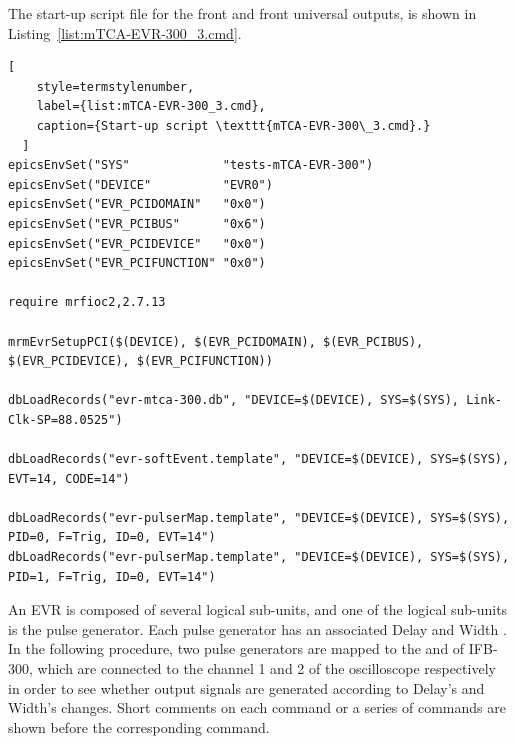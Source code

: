 \documentclass[11pt
  , a4paper
  , article
  , oneside
  , showtrims
]{memoir}
\begin{document}
The start-up script file for the front and front universal outputs,  is shown in Listing~\ref{list:mTCA-EVR-300_3.cmd}. 
\begin{lstlisting}[ 
    style=termstylenumber,
    label={list:mTCA-EVR-300_3.cmd},
    caption={Start-up script \texttt{mTCA-EVR-300\_3.cmd}.}
  ]
epicsEnvSet("SYS"             "tests-mTCA-EVR-300")
epicsEnvSet("DEVICE"          "EVR0")
epicsEnvSet("EVR_PCIDOMAIN"   "0x0")
epicsEnvSet("EVR_PCIBUS"      "0x6")
epicsEnvSet("EVR_PCIDEVICE"   "0x0")
epicsEnvSet("EVR_PCIFUNCTION" "0x0")

require mrfioc2,2.7.13

mrmEvrSetupPCI($(DEVICE), $(EVR_PCIDOMAIN), $(EVR_PCIBUS), $(EVR_PCIDEVICE), $(EVR_PCIFUNCTION))

dbLoadRecords("evr-mtca-300.db", "DEVICE=$(DEVICE), SYS=$(SYS), Link-Clk-SP=88.0525")

dbLoadRecords("evr-softEvent.template", "DEVICE=$(DEVICE), SYS=$(SYS), EVT=14, CODE=14")

dbLoadRecords("evr-pulserMap.template", "DEVICE=$(DEVICE), SYS=$(SYS), PID=0, F=Trig, ID=0, EVT=14")  
dbLoadRecords("evr-pulserMap.template", "DEVICE=$(DEVICE), SYS=$(SYS), PID=1, F=Trig, ID=0, EVT=14")  
\end{lstlisting}

An EVR is composed of several logical sub-units, and one of the logical sub-units is the pulse generator. Each pulse generator has an associated Delay and Width \cite{EVR-USER-GUIDE}. In the following procedure, two pulse generators are mapped to the  and  of IFB-300, which are connected to the channel 1 and 2 of the oscilloscope respectively in order to see whether output signals are generated according to Delay's and Width's changes. Short comments on each command or a series of commands are shown before the corresponding command.
\end{document}
